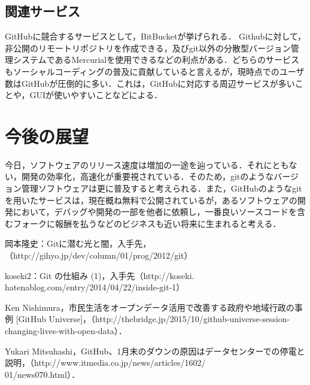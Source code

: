 \documentclass[a4j,9pt,twocolumn]{jsarticle}
\begin{document}
\subsection{関連サービス}
GitHubに競合するサービスとして，BitBucketが挙げられる． Githubに対して，非公開のリモートリポジトリを作成できる，及びgit以外の分散型バージョン管理システムであるMercurialを使用できるなどの利点がある．どちらのサービスもソーシャルコーディングの普及に貢献していると言えるが，現時点でのユーザ数はGitHubが圧倒的に多い．これは，GitHubに対応する周辺サービスが多いことや，GUIが使いやすいことなどによる．

\section{今後の展望}
今日，ソフトウェアのリリース速度は増加の一途を辿っている．それにともない，開発の効率化，高速化が重要視されている．そのため，gitのようなバージョン管理ソフトウェアは更に普及すると考えられる．また，GitHubのようなgitを用いたサービスは，現在概ね無料で公開されているが，あるソフトウェアの開発において，デバッグや開発の一部を他者に依頼し，一番良いソースコードを含むフォークに報酬を払うなどのビジネスも近い将来に生まれると考える．

\small
\begin{thebibliography}{99}
岡本隆史：Gitに潜む光と闇，入手先，（http://gihyo.jp/dev/column/01/prog/2012/git）

koseki2：Git の仕組み (1)，入手先（http://koseki.\\hatenablog.com/entry/2014/04/22/inside-git-1）

Ken Nishimura，市民生活をオープンデータ活用で改善する政府や地域行政の事例 [GitHub Universe]，（http://thebridge.jp/2015/10/github-universe-session-changing-lives-with-open-data）．

Yukari Mitsuhashi，GitHub、1月末のダウンの原因はデータセンターでの停電と説明，（http://www.itmedia.co.jp/news/articles/1602/\\01/news070.html）．
\end{thebibliography}
\end{document}
